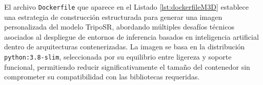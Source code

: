 




El archivo \verb|Dockerfile| que aparece en el Listado \ref{lst:dockerfileM3D} establece una estrategia de construcción estructurada para generar una imagen personalizada del modelo TripoSR, abordando múltiples desafíos técnicos asociados al despliegue de entornos de inferencia basados en inteligencia artificial dentro de arquitecturas contenerizadas. La imagen se basa en la distribución \verb|python:3.8-slim|, seleccionada por su equilibrio entre ligereza y soporte funcional, permitiendo reducir significativamente el tamaño del contenedor sin comprometer su compatibilidad con las bibliotecas requeridas.




